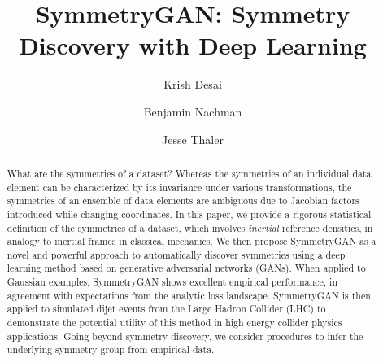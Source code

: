 \documentclass[aps,prx,reprint,preprintnumbers,superscriptaddress,nofootinbib,longbibliography,floatfix]{revtex4-1}
\begin{document}
\title{SymmetryGAN: Symmetry Discovery with Deep Learning}

\author{Krish Desai}

\author{Benjamin Nachman}

\author{Jesse Thaler}


\begin{abstract}

What are the symmetries of a dataset?
%
Whereas the symmetries of an individual data element can be characterized by its invariance under various transformations, the symmetries of an ensemble of data elements are ambiguous due to Jacobian factors introduced while changing coordinates.
%
In this paper, we provide a rigorous statistical definition of the symmetries of a dataset, which involves \textit{inertial} reference densities, in analogy to inertial frames in classical mechanics.
%
We then propose SymmetryGAN as a novel and powerful approach to automatically discover symmetries using a deep learning method based on generative adversarial networks (GANs).
%
When applied to Gaussian examples, SymmetryGAN shows excellent empirical performance, in agreement with expectations from the analytic loss landscape.
%
SymmetryGAN is then applied to simulated dijet events from the Large Hadron Collider (LHC) to demonstrate the potential utility of this method in high energy collider physics applications.
%
Going beyond symmetry discovery, we consider procedures to infer the underlying symmetry group from empirical data.
%
\end{abstract}

\maketitle

{\small
\tableofcontents
}
\end{document}
